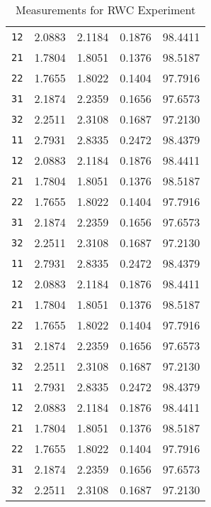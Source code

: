\begin{appendices}
\begin{table}[htb]
\begin{tabular}{lllll}
        \texttt{12} & 2.0883 & 2.1184 & 0.1876 & 98.4411 \\
        \texttt{21} & 1.7804 & 1.8051 & 0.1376 & 98.5187 \\
        \texttt{22} & 1.7655 & 1.8022 & 0.1404 & 97.7916 \\
        \texttt{31} & 2.1874 & 2.2359 & 0.1656 & 97.6573 \\
        \texttt{32} & 2.2511 & 2.3108 & 0.1687 & 97.2130 \\
        \texttt{11} & 2.7931 & 2.8335 & 0.2472 & 98.4379 \\
        \texttt{12} & 2.0883 & 2.1184 & 0.1876 & 98.4411 \\
        \texttt{21} & 1.7804 & 1.8051 & 0.1376 & 98.5187 \\
        \texttt{22} & 1.7655 & 1.8022 & 0.1404 & 97.7916 \\
        \texttt{31} & 2.1874 & 2.2359 & 0.1656 & 97.6573 \\
        \texttt{32} & 2.2511 & 2.3108 & 0.1687 & 97.2130 \\
        \texttt{11} & 2.7931 & 2.8335 & 0.2472 & 98.4379 \\
        \texttt{12} & 2.0883 & 2.1184 & 0.1876 & 98.4411 \\
        \texttt{21} & 1.7804 & 1.8051 & 0.1376 & 98.5187 \\
        \texttt{22} & 1.7655 & 1.8022 & 0.1404 & 97.7916 \\
        \texttt{31} & 2.1874 & 2.2359 & 0.1656 & 97.6573 \\
        \texttt{32} & 2.2511 & 2.3108 & 0.1687 & 97.2130 \\
        \texttt{11} & 2.7931 & 2.8335 & 0.2472 & 98.4379 \\
        \texttt{12} & 2.0883 & 2.1184 & 0.1876 & 98.4411 \\
        \texttt{21} & 1.7804 & 1.8051 & 0.1376 & 98.5187 \\
        \texttt{22} & 1.7655 & 1.8022 & 0.1404 & 97.7916 \\
        \texttt{31} & 2.1874 & 2.2359 & 0.1656 & 97.6573 \\
        \texttt{32} & 2.2511 & 2.3108 & 0.1687 & 97.2130 \\
      \bottomrule
    \end{tabular}
    \caption{%
      Measurements for RWC Experiment
    }
    \label{tab:Packages}
  \end{table}

\end{appendices}
